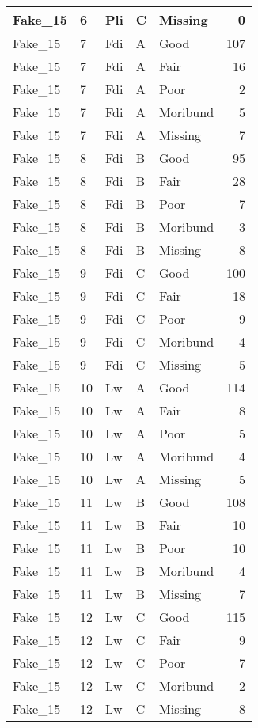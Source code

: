 \documentclass[
]{article}
\begin{document}
\begin{tabular}{l|l|l|l|l|r}
\hline
Fake\_15 & 6 & Pli & C & Missing & 0\\
\hline
Fake\_15 & 7 & Fdi & A & Good & 107\\
\hline
Fake\_15 & 7 & Fdi & A & Fair & 16\\
\hline
Fake\_15 & 7 & Fdi & A & Poor & 2\\
\hline
Fake\_15 & 7 & Fdi & A & Moribund & 5\\
\hline
Fake\_15 & 7 & Fdi & A & Missing & 7\\
\hline
Fake\_15 & 8 & Fdi & B & Good & 95\\
\hline
Fake\_15 & 8 & Fdi & B & Fair & 28\\
\hline
Fake\_15 & 8 & Fdi & B & Poor & 7\\
\hline
Fake\_15 & 8 & Fdi & B & Moribund & 3\\
\hline
Fake\_15 & 8 & Fdi & B & Missing & 8\\
\hline
Fake\_15 & 9 & Fdi & C & Good & 100\\
\hline
Fake\_15 & 9 & Fdi & C & Fair & 18\\
\hline
Fake\_15 & 9 & Fdi & C & Poor & 9\\
\hline
Fake\_15 & 9 & Fdi & C & Moribund & 4\\
\hline
Fake\_15 & 9 & Fdi & C & Missing & 5\\
\hline
Fake\_15 & 10 & Lw & A & Good & 114\\
\hline
Fake\_15 & 10 & Lw & A & Fair & 8\\
\hline
Fake\_15 & 10 & Lw & A & Poor & 5\\
\hline
Fake\_15 & 10 & Lw & A & Moribund & 4\\
\hline
Fake\_15 & 10 & Lw & A & Missing & 5\\
\hline
Fake\_15 & 11 & Lw & B & Good & 108\\
\hline
Fake\_15 & 11 & Lw & B & Fair & 10\\
\hline
Fake\_15 & 11 & Lw & B & Poor & 10\\
\hline
Fake\_15 & 11 & Lw & B & Moribund & 4\\
\hline
Fake\_15 & 11 & Lw & B & Missing & 7\\
\hline
Fake\_15 & 12 & Lw & C & Good & 115\\
\hline
Fake\_15 & 12 & Lw & C & Fair & 9\\
\hline
Fake\_15 & 12 & Lw & C & Poor & 7\\
\hline
Fake\_15 & 12 & Lw & C & Moribund & 2\\
\hline
Fake\_15 & 12 & Lw & C & Missing & 8\\

\end{tabular}
\end{document}
